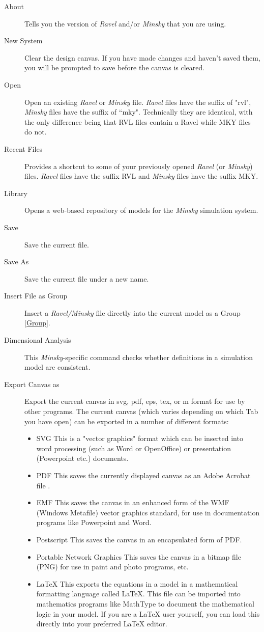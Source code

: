 \label{File}
\begin{description}
\item [{About}] Tells you the version of \emph{Ravel} and/or \emph{Minsky}
that you are using.
\item [{New System}] Clear the design canvas. If you have made changes
and haven't saved them, you will be prompted to save before the canvas
is cleared.
\item [{Open}] Open an existing \emph{Ravel} or \emph{Minsky} file. \emph{Ravel}
files have the suffix of "rvl", \emph{Minsky} files have the suffix
of ``mky". Technically they are identical, with the only difference
being that RVL files contain a Ravel while MKY files do not.
\item [{Recent Files}] \label{recentfiles} Provides a shortcut to some
of your previously opened \emph{Ravel} (or \emph{Minsky}) files. \emph{Ravel}
files have the suffix RVL and \emph{Minsky }files have the suffix
MKY.
\item [{Library}] Opens a web-based repository of models for the \emph{Minsky}
simulation system.
\item [{Save}] Save the current file.
\item [{Save As}] Save the current file under a new name.
\item [{Insert File as Group}] Insert a \emph{Ravel/Minsky} file directly
into the current model as a Group \ref{Group}.
\item [{Dimensional Analysis}] This \emph{Minsky}-specific command checks
whether definitions in a simulation model are consistent.
\item [{Export Canvas as}] Export the current canvas in svg, pdf, eps,
tex, or m format for use by other programs. The current canvas (which
varies depending on which Tab you have open) can be exported in a
number of different formats:
\begin{itemize}
\item SVG This is a "vector graphics" format which can be inserted into
word processing (such as Word or OpenOffice) or presentation (Powerpoint
etc.) documents. 
\item PDF This saves the currently displayed canvas as an Adobe Acrobat
file .
\item EMF This saves the canvas in an enhanced form of the WMF (Windows
Metafile) vector graphics standard, for use in documentation programs
like Powerpoint and Word. 
\item Postscript This saves the canvas in an encapsulated form of PDF.
\item Portable Network Graphics This saves the canvas in a bitmap file (PNG)
for use in paint and photo programs, etc. 
\item LaTeX This exports the equations in a model in a mathematical formatting
language called LaTeX. This file can be imported into mathematics
programs like MathType to document the mathematical logic in your
model. If you are a LaTeX user yourself, you can load this directly
into your preferred LaTeX editor.


\end{itemize}
\end{description}
